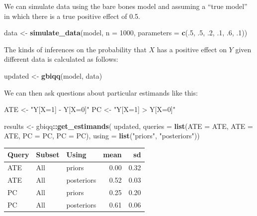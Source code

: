 \documentclass[12pt,]{book}
\newenvironment{Shaded}{\begin{snugshade}}{\end{snugshade}}
\newcommand{\DataTypeTok}[1]{\textcolor[rgb]{0.13,0.29,0.53}{#1}}
\newcommand{\DecValTok}[1]{\textcolor[rgb]{0.00,0.00,0.81}{#1}}
\newcommand{\FloatTok}[1]{\textcolor[rgb]{0.00,0.00,0.81}{#1}}
\newcommand{\KeywordTok}[1]{\textcolor[rgb]{0.13,0.29,0.53}{\textbf{#1}}}
\newcommand{\NormalTok}[1]{#1}
\newcommand{\OperatorTok}[1]{\textcolor[rgb]{0.81,0.36,0.00}{\textbf{#1}}}
\newcommand{\StringTok}[1]{\textcolor[rgb]{0.31,0.60,0.02}{#1}}
\begin{document}
We can simulate data using the bare bones model and assuming a ``true model'' in which there is a true positive effect of 0.5.

\begin{Shaded}
\begin{Highlighting}[]
\NormalTok{data <-}\StringTok{ }\KeywordTok{simulate_data}\NormalTok{(model, }\DataTypeTok{n =} \DecValTok{1000}\NormalTok{, }
                      \DataTypeTok{parameters =} \KeywordTok{c}\NormalTok{(.}\DecValTok{5}\NormalTok{, }\FloatTok{.5}\NormalTok{, }\FloatTok{.2}\NormalTok{, }\FloatTok{.1}\NormalTok{, }\FloatTok{.6}\NormalTok{, }\FloatTok{.1}\NormalTok{))}
\end{Highlighting}
\end{Shaded}

The kinds of inferences on the probability that \(X\) has a positive effect on \(Y\) given different data is calculated as follows:

\begin{Shaded}
\begin{Highlighting}[]
\NormalTok{updated <-}\StringTok{ }\KeywordTok{gbiqq}\NormalTok{(model, data)}
\end{Highlighting}
\end{Shaded}

We can then ask questions about particular estimands like this:

\begin{Shaded}
\begin{Highlighting}[]
\NormalTok{ATE <-}\StringTok{ "Y[X=1] - Y[X=0]"}
\NormalTok{PC  <-}\StringTok{ "Y[X=1] > Y[X=0]"}

\NormalTok{results <-}\StringTok{ }\NormalTok{gbiqq}\OperatorTok{::}\KeywordTok{get_estimands}\NormalTok{(}
\NormalTok{ updated,}
 \DataTypeTok{queries =} \KeywordTok{list}\NormalTok{(}\DataTypeTok{ATE =}\NormalTok{ ATE, }\DataTypeTok{ATE =}\NormalTok{ ATE, }\DataTypeTok{PC =}\NormalTok{ PC, }\DataTypeTok{PC =}\NormalTok{ PC),}
 \DataTypeTok{using =} \KeywordTok{list}\NormalTok{(}\StringTok{"priors"}\NormalTok{, }\StringTok{"posteriors"}\NormalTok{))}
\end{Highlighting}
\end{Shaded}

\begin{tabular}{l|l|l|r|r}
\hline
Query & Subset & Using & mean & sd\\
\hline
ATE & All & priors & 0.00 & 0.32\\
\hline
ATE & All & posteriors & 0.52 & 0.03\\
\hline
PC & All & priors & 0.25 & 0.20\\
\hline
PC & All & posteriors & 0.61 & 0.06\\
\hline
\end{tabular}
\end{document}
